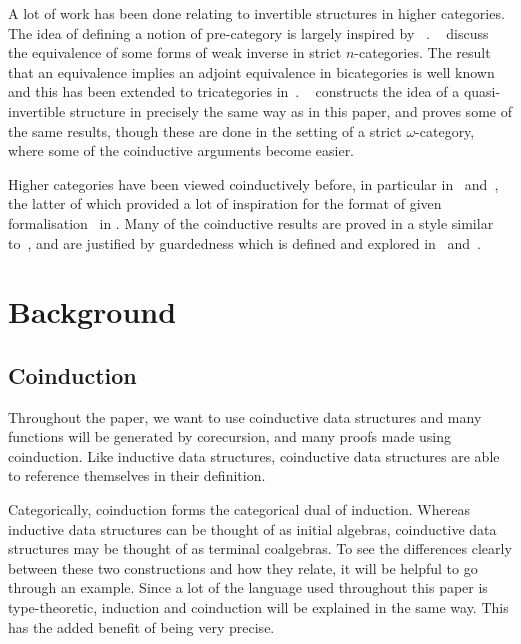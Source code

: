 \documentclass{article}
\theoremstyle{definition}
\theoremstyle{remark}
\begin{document}
A lot of work has been done relating to invertible structures in higher categories. The idea of defining a notion of pre-category is largely inspired by \citeauthor{Cheng2007}~\cite{Cheng2007}. \citeauthor{kansangian2009weak}~\cite{kansangian2009weak} discuss the equivalence of some forms of weak inverse in strict \(n\)-categories. The result that an equivalence implies an adjoint equivalence in bicategories is well known and this has been extended to tricategories in~\cite{gurski2012biequivalences}. \citeauthor*{lafont2010folk}~\cite{lafont2010folk} constructs the idea of a quasi-invertible structure in precisely the same way as in this paper, and proves some of the same results, though these are done in the setting of a strict \(\omega\)-category, where some of the coinductive arguments become easier.

Higher categories have been viewed coinductively before, in particular in~\cite{cheng2012weak} and~\cite{hirschowitz_et_al:LIPIcs:2015:5166}, the latter of which provided a lot of inspiration for the format of given formalisation~\cite{rice_agda} in . Many of the coinductive results are proved in a style similar to~\cite{kozen_silva_2017}, and are justified by guardedness which is defined and explored in~\cite{10.1007/3-540-58085-9_72} and~\cite{gimenez1995codifying}.


\section{Background}\label{sec:background}

\subsection{Coinduction}\label{sec:coinduction}

Throughout the paper, we want to use coinductive data structures and many functions will be generated by corecursion, and many proofs made using coinduction. Like inductive data structures, coinductive data structures are able to reference themselves in their definition.

Categorically, coinduction forms the categorical dual of induction. Whereas inductive data structures can be thought of as initial algebras, coinductive data structures may be thought of as terminal coalgebras. To see the differences clearly between these two constructions and how they relate, it will be helpful to go through an example. Since a lot of the language used throughout this paper is type-theoretic, induction and coinduction will be explained in the same way. This has the added benefit of being very precise.
\end{document}
